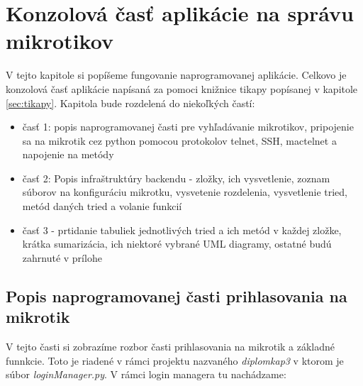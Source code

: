 \chapter{Konzolová časť aplikácie na správu mikrotikov}
V tejto kapitole si popíšeme fungovanie naprogramovanej aplikácie. Celkovo je konzolová časť aplikácie napísaná za pomoci knižnice tikapy popísanej v kapitole \ref{sec:tikapy}. Kapitola bude rozdelená do niekoľkých častí:\begin{itemize}
\item časť 1: popis naprogramovanej časti pre vyhľadávanie mikrotikov, pripojenie sa na mikrotik cez python pomocou protokolov telnet, SSH, mactelnet a napojenie na metódy
\item časť 2: Popis infraštruktúry backendu - zložky, ich vysvetlenie, zoznam súborov na konfiguráciu mikrotku, vysvetenie rozdelenia, vysvetlenie tried, metód daných tried a volanie funkcií
\item časť 3 - prtidanie tabuliek jednotlivých tried a ich metód v každej zložke, krátka sumarizácia, ich niektoré vybrané UML diagramy, ostatné budú zahrnuté v prílohe
\end{itemize}
\section{Popis naprogramovanej časti prihlasovania na mikrotik}
\label{sec:popis1}
V tejto časti si zobrazíme rozbor časti prihlasovania na mikrotik a základné funnkcie. Toto je riadené v rámci projektu nazvaného \textit{diplomkap3} v ktorom je súbor \textit{loginManager.py}. V rámci login managera tu nachádzame:
